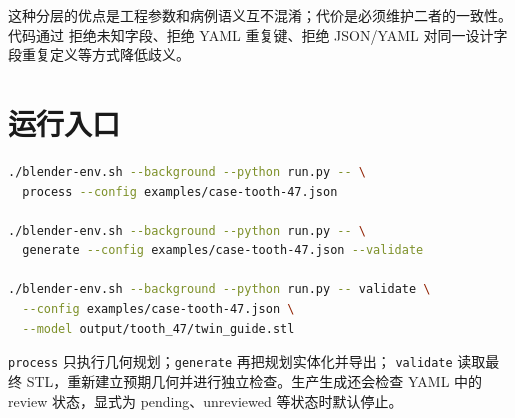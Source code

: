这种分层的优点是工程参数和病例语义互不混淆；代价是必须维护二者的一致性。代码通过
拒绝未知字段、拒绝 YAML 重复键、拒绝 JSON/YAML 对同一设计字段重复定义等方式降低歧义。

\section{运行入口}

\begin{lstlisting}[language=bash,caption={当前项目的三个主要命令}]
./blender-env.sh --background --python run.py -- \
  process --config examples/case-tooth-47.json

./blender-env.sh --background --python run.py -- \
  generate --config examples/case-tooth-47.json --validate

./blender-env.sh --background --python run.py -- validate \
  --config examples/case-tooth-47.json \
  --model output/tooth_47/twin_guide.stl
\end{lstlisting}

\texttt{process} 只执行几何规划；\texttt{generate} 再把规划实体化并导出；
\texttt{validate} 读取最终 STL，重新建立预期几何并进行独立检查。生产生成还会检查 YAML
中的 review 状态，显式为 pending、unreviewed 等状态时默认停止。

